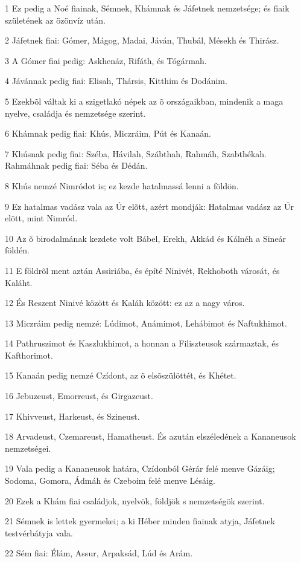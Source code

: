 \par 1 Ez pedig a Noé fiainak, Sémnek, Khámnak és Jáfetnek nemzetsége; és fiaik születének az özönvíz után.
\par 2 Jáfetnek fiai: Gómer, Mágog, Madai, Jáván, Thubál, Mésekh és Thirász.
\par 3 A Gómer fiai pedig: Askhenáz, Rifáth, és Tógármah.
\par 4 Jávánnak pedig fiai: Elisah, Thársis, Kitthim és Dodánim.
\par 5 Ezekbõl váltak ki a szigetlakó népek az õ országaikban, mindenik a maga nyelve, családja és nemzetsége szerint.
\par 6 Khámnak pedig fiai: Khús, Miczráim, Pút és Kanaán.
\par 7 Khúsnak pedig fiai: Széba, Hávilah, Szábthah, Rahmáh, Szabthékah. Rahmáhnak pedig fiai: Séba és Dédán.
\par 8 Khús nemzé Nimródot is; ez kezde hatalmassá lenni a földön.
\par 9 Ez hatalmas vadász vala az Úr elõtt, azért mondják: Hatalmas vadász az Úr elõtt, mint Nimród.
\par 10 Az õ birodalmának kezdete volt Bábel, Erekh, Akkád és Kálnéh a Sineár földén.
\par 11 E földrõl ment aztán Assiriába, és építé Ninivét, Rekhoboth városát, és Kaláht.
\par 12 És Reszent Ninivé között és Kaláh között: ez az a nagy város.
\par 13 Miczráim pedig nemzé: Lúdimot, Anámimot, Lehábimot és Naftukhimot.
\par 14 Pathruszimot és Kaszlukhimot, a honnan a Filiszteusok származtak, és Kafthorimot.
\par 15 Kanaán pedig nemzé Czídont, az õ elsõszülöttét, és Khétet.
\par 16 Jebuzeust, Emorreust, és Girgazeust.
\par 17 Khivveust, Harkeust, és Szineust.
\par 18 Arvadeust, Czemareust, Hamatheust. És azután elszéledének a Kananeusok nemzetségei.
\par 19 Vala pedig a Kananeusok határa, Czídonból Gérár felé menve Gázáig; Sodoma, Gomora, Ádmáh és Czeboim felé menve Lésáig.
\par 20 Ezek a Khám fiai családjok, nyelvök, földjök s nemzetségök szerint.
\par 21 Sémnek is lettek gyermekei; a ki Héber minden fiainak atyja, Jáfetnek testvérbátyja vala.
\par 22 Sém fiai: Élám, Assur, Arpaksád, Lúd és Arám.
